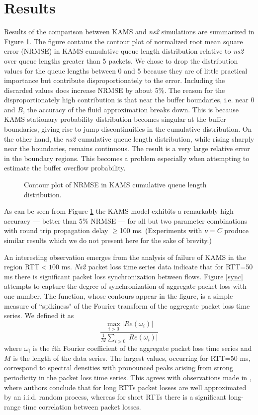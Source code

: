 \documentclass{IEEEtran}[10pt,letterpaper,conference]
\begin{document}
\section{Results}
\label{results}
Results of the comparison between KAMS and \emph{ns2} simulations are summarized in Figure \ref{NRMSE}. The figure contains the contour plot of normalized root mean square error (NRMSE) in KAMS cumulative queue length distribution relative to \emph{ns2} over queue lengths greater than 5 packets.
We chose to drop the distribution values for the queue lengths between 0 and 5 because they are of little practical importance but contribute disproportionately to the error. Including the discarded values does increase NRMSE by about 5\%. The reason for the disproportionately high contribution is that near the buffer boundaries, i.e. near 0 and $B$, the accuracy of the fluid approximation breaks down. This is because KAMS stationary probability distribution becomes singular at the buffer boundaries, giving rise to jump discontinuities in the cumulative distribution. On the other hand, the \emph{ns2} cumulative queue length distribution, while rising sharply near the boundaries, remains continuous. The result is a very large relative error in the boundary regions. This becomes a problem especially when attempting to estimate the buffer overflow probability.

\begin{figure}[ht]
\caption{Contour plot of NRMSE in KAMS cumulative queue length distribution.}
\label{NRMSE}
\end{figure}

As can be seen from Figure \ref{NRMSE} the KAMS model exhibits a remarkably high accuracy --- better than 5\% NRMSE --- for all but two parameter combinations with round trip propagation delay $\geq$100 ms. (Experiments with $\nu=C$ produce similar results which we do not present here for the sake of brevity.)

An interesting observation emerges from the analysis of failure of KAMS in the region RTT$<100$ ms. \emph{Ns2} packet loss time series data indicate that for RTT=50 ms there is significant packet loss synchronization between flows. Figure \ref{sync} attempts to capture the degree of synchronization of aggregate packet loss with one number. The function, whose contours appear in the figure, is a simple measure of ``spikiness" of the Fourier transform of the aggregate packet loss time series. We defined it as
\begin{equation}
\frac{\max_{i>0} |Re(\omega_i)|}{\frac{1}{M}\sum_{i>0}|Re(\omega_i)|}
\end{equation}
where $\omega_i$ is the $i$th Fourier coefficient of the aggregate packet loss time series and $M$ is the length of the data series. The largest values, occurring for RTT=50 ms, correspond to spectral densities with pronounced peaks arising from strong periodicity in the packet loss time series. This agrees with observations made in \cite{AltAvrCha}, where authors conclude that for long RTTs packet losses are well approximated by an i.i.d. random process, whereas for short RTTs there is a significant long-range time correlation between packet losses.
\end{document}
